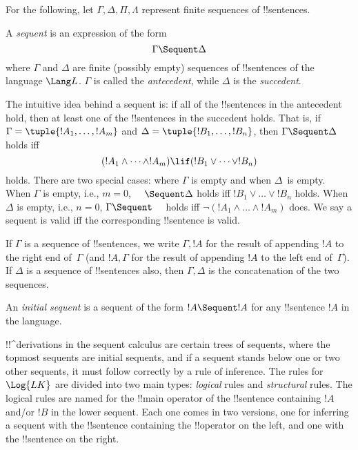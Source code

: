 \documentclass[../../../include/open-logic-section]{subfiles}
\begin{document}
      {}
      {}


For the following, let $\Gamma, \Delta, \Pi, \Lambda$ represent finite
sequences of !!{sentence}s.

\begin{defn}[Sequent]
A \emph{sequent} is an expression of the form
\[
\Gamma \Sequent \Delta
\]
where $\Gamma$ and $\Delta$ are finite (possibly empty) sequences of
!!{sentence}s of the language $\Lang L$. $\Gamma$ is called the
\emph{antecedent}, while $\Delta$ is the \emph{succedent}.
\end{defn}

\begin{explain}
The intuitive idea behind a sequent is: if all of the !!{sentence}s in
the antecedent hold, then at least one of the !!{sentence}s in the
succedent holds. That is, if $\Gamma = \tuple{!A_1, \dots, !A_m}$ and
$\Delta = \tuple{!B_1, \dots, !B_n}$, then $\Gamma \Sequent \Delta$
holds iff
\[
(!A_1 \land \cdots \land !A_m) \lif (!B_1 \lor \cdots \lor
!B_n)
\]
holds. There are two special cases: where $\Gamma$ is empty and when
$\Delta$~is empty. When $\Gamma$ is empty, i.e., $m = 0$, $\quad
\Sequent \Delta$ holds iff $!B_1 \lor \dots \lor !B_n$ holds. When
$\Delta$ is empty, i.e., $n = 0$, $\Gamma \Sequent \quad$ holds iff
$\lnot(!A_1 \land \dots \land !A_m)$ does.  We say a sequent is valid
iff the corresponding !!{sentence} is valid.
\end{explain}

If $\Gamma$ is a sequence of !!{sentence}s, we write $\Gamma, !A$ for
the result of appending $!A$ to the right end of~$\Gamma$ (and $!A,
\Gamma$ for the result of appending $!A$ to the left end
of~$\Gamma$). If $\Delta$ is a sequence of !!{sentence}s also, then $\Gamma,
\Delta$ is the concatenation of the two sequences.

\begin{defn}
An \emph{initial sequent} is a sequent
{of the form $!A \Sequent !A$} for any !!{sentence} $!A$ in the language.
\end{defn}

!!^{derivation}s in the sequent calculus are certain trees of
sequents, where the topmost sequents are initial sequents, and if a
sequent stands below one or two other sequents, it must follow
correctly by a rule of inference.  The rules for $\Log{LK}$ are
divided into two main types: \emph{logical} rules and
\emph{structural} rules.  The logical rules are named for the !!{main
  operator} of the !!{sentence} containing $!A$ and/or $!B$ in the
lower sequent. Each one comes in two versions, one for inferring a
sequent with the !!{sentence} containing the !!{operator} on the left,
and one with the !!{sentence} on the right.
\end{document}
